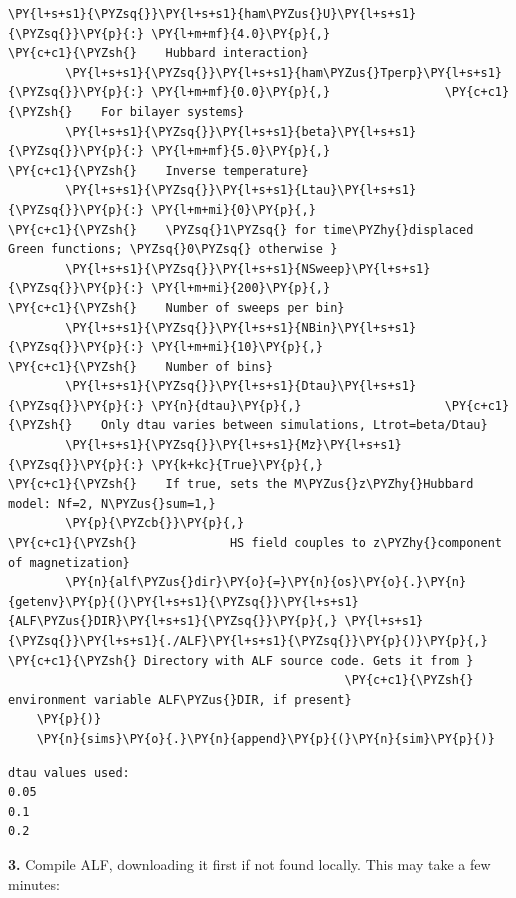 \begin{tcolorbox}[breakable, size=fbox, boxrule=1pt, pad at break*=1mm,colback=cellbackground, colframe=cellborder]
\begin{Verbatim}[commandchars=\\\{\}]
        \PY{l+s+s1}{\PYZsq{}}\PY{l+s+s1}{ham\PYZus{}U}\PY{l+s+s1}{\PYZsq{}}\PY{p}{:} \PY{l+m+mf}{4.0}\PY{p}{,}                    \PY{c+c1}{\PYZsh{}    Hubbard interaction}
        \PY{l+s+s1}{\PYZsq{}}\PY{l+s+s1}{ham\PYZus{}Tperp}\PY{l+s+s1}{\PYZsq{}}\PY{p}{:} \PY{l+m+mf}{0.0}\PY{p}{,}                \PY{c+c1}{\PYZsh{}    For bilayer systems}
        \PY{l+s+s1}{\PYZsq{}}\PY{l+s+s1}{beta}\PY{l+s+s1}{\PYZsq{}}\PY{p}{:} \PY{l+m+mf}{5.0}\PY{p}{,}                     \PY{c+c1}{\PYZsh{}    Inverse temperature}
        \PY{l+s+s1}{\PYZsq{}}\PY{l+s+s1}{Ltau}\PY{l+s+s1}{\PYZsq{}}\PY{p}{:} \PY{l+m+mi}{0}\PY{p}{,}                       \PY{c+c1}{\PYZsh{}    \PYZsq{}1\PYZsq{} for time\PYZhy{}displaced Green functions; \PYZsq{}0\PYZsq{} otherwise }
        \PY{l+s+s1}{\PYZsq{}}\PY{l+s+s1}{NSweep}\PY{l+s+s1}{\PYZsq{}}\PY{p}{:} \PY{l+m+mi}{200}\PY{p}{,}                   \PY{c+c1}{\PYZsh{}    Number of sweeps per bin}
        \PY{l+s+s1}{\PYZsq{}}\PY{l+s+s1}{NBin}\PY{l+s+s1}{\PYZsq{}}\PY{p}{:} \PY{l+m+mi}{10}\PY{p}{,}                      \PY{c+c1}{\PYZsh{}    Number of bins}
        \PY{l+s+s1}{\PYZsq{}}\PY{l+s+s1}{Dtau}\PY{l+s+s1}{\PYZsq{}}\PY{p}{:} \PY{n}{dtau}\PY{p}{,}                    \PY{c+c1}{\PYZsh{}    Only dtau varies between simulations, Ltrot=beta/Dtau}
        \PY{l+s+s1}{\PYZsq{}}\PY{l+s+s1}{Mz}\PY{l+s+s1}{\PYZsq{}}\PY{p}{:} \PY{k+kc}{True}\PY{p}{,}                      \PY{c+c1}{\PYZsh{}    If true, sets the M\PYZus{}z\PYZhy{}Hubbard model: Nf=2, N\PYZus{}sum=1,}
        \PY{p}{\PYZcb{}}\PY{p}{,}                               \PY{c+c1}{\PYZsh{}             HS field couples to z\PYZhy{}component of magnetization}
        \PY{n}{alf\PYZus{}dir}\PY{o}{=}\PY{n}{os}\PY{o}{.}\PY{n}{getenv}\PY{p}{(}\PY{l+s+s1}{\PYZsq{}}\PY{l+s+s1}{ALF\PYZus{}DIR}\PY{l+s+s1}{\PYZsq{}}\PY{p}{,} \PY{l+s+s1}{\PYZsq{}}\PY{l+s+s1}{./ALF}\PY{l+s+s1}{\PYZsq{}}\PY{p}{)}\PY{p}{,} \PY{c+c1}{\PYZsh{} Directory with ALF source code. Gets it from }
                                               \PY{c+c1}{\PYZsh{} environment variable ALF\PYZus{}DIR, if present}
    \PY{p}{)}
    \PY{n}{sims}\PY{o}{.}\PY{n}{append}\PY{p}{(}\PY{n}{sim}\PY{p}{)}
\end{Verbatim}
\end{tcolorbox}

    \begin{Verbatim}[commandchars=\\\{\}]
dtau values used:
0.05
0.1
0.2
    \end{Verbatim}

    \textbf{3.} Compile ALF, downloading it first if not found locally. This
may take a few minutes:

